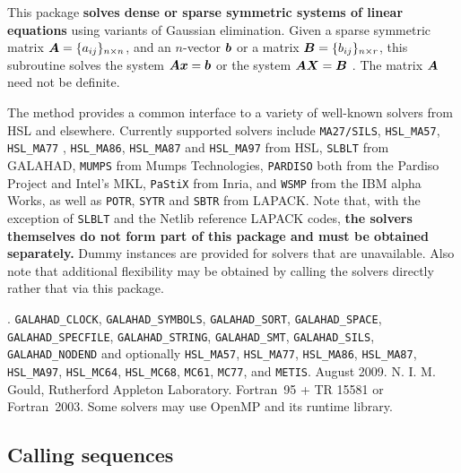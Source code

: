 \documentclass{galahad}
\newcommand{\packagename}{SLS}
\newcommand{\fullpackagename}{\libraryname\_\-\packagename}
\begin{document}
\galheader


\galsummary

This package
{\bf solves dense or sparse symmetric systems of linear equations}
using variants of Gaussian elimination.
Given a sparse symmetric matrix ${\bm{A}} = \{ a_{ij} \}_{n \times n}$, and an
$n$-vector ${\bm{b}}$ or a matrix ${\bm{B}} = \{ b_{ij} \}_{n \times r}$, this
subroutine solves the system ${\bm{A}} {\bm{x}} = {\bm{b}}$ or the system ${\bm{A}}
{\bm{X}} = {\bm{B}}$ . The matrix ${\bm{A}}$ need not be definite.

\noindent The method provides a common interface to a variety of well-known
solvers from HSL and elsewhere. Currently supported solvers include
{\tt MA27/SILS}, {\tt HSL\_MA57}, {\tt HSL\_MA77} , {\tt HSL\_MA86},
{\tt HSL\_MA87} and {\tt HSL\_MA97} from {HSL},
{\tt SLBLT} from {GALAHAD},
{\tt MUMPS} from Mumps Technologies,
{\tt PARDISO} both from the Pardiso Project and Intel's MKL,
{\tt PaStiX} from Inria, and
{\tt WSMP} from the IBM alpha Works, 
as well as {\tt POTR}, {\tt SYTR} and {\tt SBTR} from LAPACK.
Note that, with the exception of {\tt SLBLT} and the Netlib
reference LAPACK codes,
{\bf the solvers themselves do not form part of this package and
must be obtained separately.}
Dummy instances are provided for solvers that are unavailable.
Also note that additional flexibility may be obtained by calling the
solvers directly rather that via this package.


\galattributes
\galversions{\tt  \fullpackagename\_single, \fullpackagename\_double}.
\galcalls
{\tt GALAHAD\_CLOCK},
{\tt GALAHAD\-\_SYMBOLS},
{\tt GALAHAD\_\-SORT},
{\tt GALAHAD\_SPACE},
{\tt GALAHAD\_SPECFILE},
{\tt GALAHAD\_STRING},
{\tt GALAHAD\_SMT},
{\tt GALAHAD\_SILS},
{\tt GALAHAD\_NODEND}
and optionally
{\tt HSL\_\-MA57},
{\tt HSL\_MA77},
{\tt HSL\_MA86},
{\tt HSL\_MA87},
{\tt HSL\_MA97},
{\tt HSL\_MC64},
{\tt HSL\_MC68},
{\tt MC61},
{\tt MC77},
and {\tt METIS}.
\galdate August 2009.
\galorigin N. I. M. Gould, Rutherford Appleton Laboratory.
\gallanguage Fortran~95 + TR 15581 or Fortran~2003.
\galparallelism Some solvers may use OpenMP and its runtime library.


\galhowto

\subsection{Calling sequences}
\end{document}
